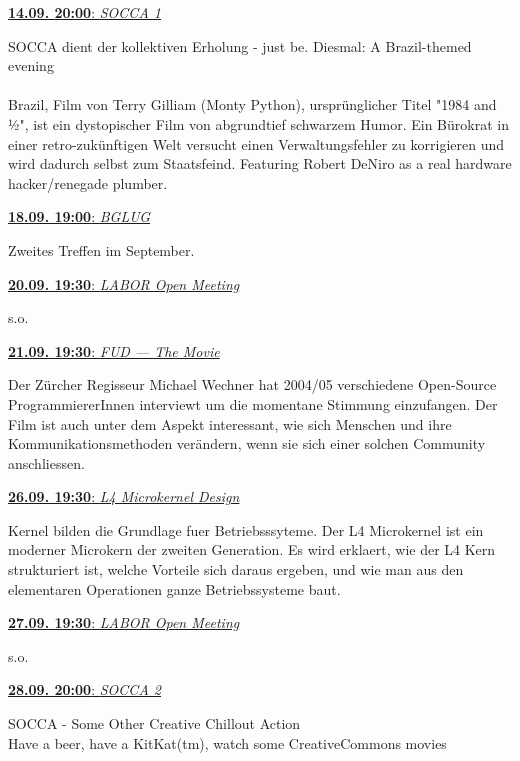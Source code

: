\documentclass[10pt,landscape,a4paper]{article}
\makeatletter
\renewcommand{\section}{\@startsection{section}{1}{0mm}%
    {-1ex plus -.5ex minus -.2ex}%
    {0.5ex plus .2ex}%
    {\normalfont\large\bfseries}}
\def\termin#1#2#3{

\noindent
\vbox{\underline{\textbf{#2}: \textit{#1}}}
#3
\vskip 4mm
}
\makeatother
\begin{document}
\begin{multicols}{3}
\termin{SOCCA 1}{14.09. 20:00}
{
SOCCA dient der kollektiven Erholung - just be. Diesmal: A Brazil-themed
evening\\
\\
Brazil, Film von Terry Gilliam (Monty Python), urspr\"unglicher Titel "1984
and ½", ist ein dystopischer Film von abgrundtief schwarzem Humor. Ein
B\"urokrat in einer retro-zuk\"unftigen Welt versucht einen Verwaltungsfehler
zu korrigieren und wird dadurch selbst zum Staatsfeind. Featuring Robert
DeNiro as a real hardware hacker/renegade plumber.
}

\termin{BGLUG}{18.09. 19:00}
{
Zweites Treffen im September.
}

\termin{LABOR Open Meeting}{20.09. 19:30}
{
s.o.
}

\termin{FUD --- The Movie}{21.09. 19:30}
{
Der Z\"urcher Regisseur Michael Wechner hat 2004/05 verschiedene Open-Source
ProgrammiererInnen interviewt um die momentane Stimmung einzufangen. Der
Film ist auch unter dem Aspekt interessant, wie sich Menschen und ihre
Kommunikationsmethoden ver\"andern, wenn sie sich einer solchen Community
anschliessen.
}

\termin{L4 Microkernel Design}{26.09. 19:30}
{
Kernel bilden die Grundlage fuer Betriebsssyteme. Der L4 Microkernel
ist ein moderner Microkern der zweiten Generation. Es wird erklaert,
wie der L4 Kern strukturiert ist, welche Vorteile sich daraus ergeben,
und wie man aus den elementaren Operationen ganze Betriebssysteme baut.
}

\vskip 5mm

\termin{LABOR Open Meeting}{27.09. 19:30}
{
s.o.
}

\termin{SOCCA 2}{28.09. 20:00}
{
SOCCA - Some Other Creative Chillout Action \\
Have a beer, have a KitKat(tm), watch some CreativeCommons movies
}


\end{multicols}
\end{document}
